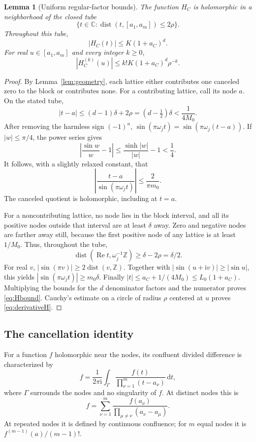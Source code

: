 \documentclass[11pt,a4paper]{article}
\numberwithin{equation}{section}
\newtheorem{lemma}[theorem]{Lemma}
\theoremstyle{definition}
\theoremstyle{remark}
\newcommand{\ii}{\mathrm i}
\newcommand{\dd}{\,\mathrm d}
\newcommand{\re}{\operatorname{Re}}
\newcommand{\dist}{\operatorname{dist}}
\newcommand{\Z}{\mathbb Z}
\newcommand{\C}{\mathbb C}
\begin{document}
\begin{lemma}[Uniform regular-factor bounds]
\label{lem:regular}
The function $H_C$ is holomorphic in a neighborhood of the closed tube
\[
 \{t\in\C:\dist(t,[a_1,a_m])\le2\rho\}.
\]
Throughout this tube,
\begin{equation}
 |H_C(t)|\le K(1+a_C)^d.
 \label{eq:Hbound}
\end{equation}
For real $u\in[a_1,a_m]$ and every integer $k\ge0$,
\begin{equation}
 |H_C^{(k)}(u)|\le k!K(1+a_C)^d\rho^{-k}.
 \label{eq:derivativeH}
\end{equation}
\end{lemma}
\begin{proof}
By Lemma~\ref{lem:geometry}, each lattice either contributes one canceled
zero to the block or contributes none. For a contributing lattice, call
its node $a$. On the stated tube,
\[
 |t-a|\le(d-1)\delta+2\rho=(d-\tfrac12)\delta<\frac1{4M_0}.
\]
After removing the harmless sign $(-1)^n$,
$\sin(\pi\omega_jt)=\sin(\pi\omega_j(t-a))$. If $|w|\le\pi/4$, the
power series gives
\[
 \left|\frac{\sin w}{w}-1\right|
 \le\frac{\sinh|w|}{|w|}-1<\frac14.
\]
It follows, with a slightly relaxed constant, that
\[
 \left|\frac{t-a}{\sin(\pi\omega_jt)}\right|
 \le\frac2{\pi m_0}.
\]
The canceled quotient is holomorphic, including at $t=a$.

For a noncontributing lattice, no node lies in the block interval, and
all its positive nodes outside that interval are at least $\delta$ away.
Zero and negative nodes are farther away still, because the first positive
node of any lattice is at least $1/M_0$. Thus, throughout the tube,
\[
 \dist(\re t,\omega_j^{-1}\Z)\ge\delta-2\rho=\delta/2.
\]
For real $v$, $|\sin(\pi v)|\ge2\dist(v,\Z)$. Together with
$|\sin(u+\ii v)|\ge|\sin u|$, this yields
$|\sin(\pi\omega_jt)|\ge m_0\delta$.
Finally $|t|\le a_C+1/(4M_0)\le L_0(1+a_C)$.
Multiplying the bounds for the $d$ denominator factors and the numerator
proves \eqref{eq:Hbound}. Cauchy's estimate on a circle of radius $\rho$
centered at $u$ proves \eqref{eq:derivativeH}.
\end{proof}

\subsection{The cancellation identity}
For a function $f$ holomorphic near the nodes, its confluent divided
difference is characterized by
\begin{equation}
 [a_1,\ldots,a_m]f
 =\frac1{2\pi\ii}\int_\Gamma
      \frac{f(t)}{\prod_{\nu=1}^m(t-a_\nu)}\dd t,
 \label{eq:DDcontour}
\end{equation}
where $\Gamma$ surrounds the nodes and no singularity of $f$. At distinct
nodes this is
\begin{equation}
 [a_1,\ldots,a_m]f
 =\sum_{\nu=1}^m\frac{f(a_\nu)}{\prod_{\mu\ne\nu}(a_\nu-a_\mu)}.
 \label{eq:DDdistinct}
\end{equation}
At repeated nodes it is defined by continuous confluence; for $m$ equal
nodes it is $f^{(m-1)}(a)/(m-1)!$.
\end{document}

